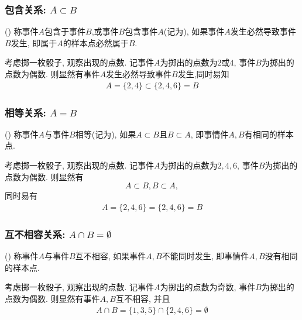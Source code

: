 \begin{frame}
  \frametitle{包含关系: $A\subset B$}
  \begin{defi} () 称事件$A$包含于事件$B$,或事件$B$包含事件$A$(记为), 如果事件$A$发生必然导致事件$B$发生, 即属于$A$的样本点必然属于$B$.
  \end{defi}
  \pause
  \begin{exam}
    考虑掷一枚骰子, 观察出现的点数. 记事件$A$为掷出的点数为$2$或$4$, 事件$B$为掷出的点数为偶数. 则显然有事件$A$发生必然导致事件$B$发生,同时易知
    \begin{eqnarray*}
      A=\{2,4\}\subset \{2,4,6\}=B
    \end{eqnarray*}
  \end{exam}
\end{frame}

\begin{frame}
  \frametitle{相等关系: $A=B$}
  \begin{defi} () 称事件$A$与事件$B$相等(记为), 如果$A\subset B$且$B\subset A$, 即事情件$A,B$有相同的样本点.
  \end{defi}

  \pause
  \begin{exam}
    考虑掷一枚骰子, 观察出现的点数. 记事件$A$为掷出的点数为$2,4,6$, 事件$B$为掷出的点数为偶数. 则显然有
    \[A\subset B, B\subset A,\] 同时易有
    \begin{eqnarray*}
      A=\{2,4, 6\}=\{2,4,6\}=B
    \end{eqnarray*}

  \end{exam}
\end{frame}
\begin{frame}
  \frametitle{互不相容关系: $A\cap B=\emptyset$}
  \begin{defi} () 称事件$A$与事件$B$互不相容, 如果事件$A, B$不能同时发生, 即事情件$A,B$没有相同的样本点.
  \end{defi}

  \pause
  \vspace{1cm}
  \begin{exam}
    考虑掷一枚骰子, 观察出现的点数. 记事件$A$为掷出的点数为奇数, 事件$B$为掷出的点数为偶数. 则显然有事件$A,B$互不相容, 并且
    \begin{eqnarray*}
      A\cap B=\{1,3,5\}\cap \{2,4,6\}=\emptyset
    \end{eqnarray*}

  \end{exam}
\end{frame}

